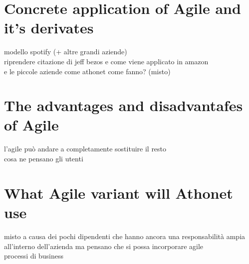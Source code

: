 

\section{Concrete application of Agile and it's derivates}
	modello spotify (+ altre grandi aziende)\\
	riprendere citazione di jeff bezos e come viene applicato in amazon\\
	e le piccole aziende come athonet come fanno? (misto)

\section{The advantages and disadvantafes of Agile}
	l'agile può andare a completamente sostituire il resto\\
	cosa ne pensano gli utenti

\section{What Agile variant will Athonet use}
	misto a causa dei pochi dipendenti che hanno ancora una responsabilità ampia all'interno dell'azienda ma pensano che si possa incorporare agile\\
	processi di business

